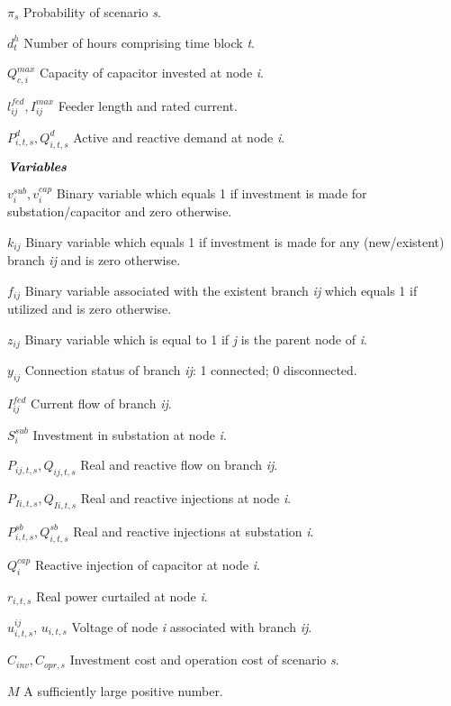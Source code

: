 \documentclass[journal]{IEEEtran}
\theoremstyle{remark}
\begin{document}
\begin{IEEEdescription}
\item[$\pi_{s}$] Probability of scenario \textit{s}.
\item[$d_{t}^{h}$] Number of hours comprising time block \textit{t}.
\item[$Q_{c,i}^{max} $] Capacity of capacitor invested at node \textit{i}.
\item[$  l_{ij}^{fed},I_{ij}^{max}$] Feeder length and rated current.
\item[$ P_{i,t,s}^{d},Q_{i,t,s}^{d}$] Active and reactive demand at node \textit{i}.\\
\item[$\textbf{\textit{Variables}}$]
\item[$v_{i}^{sub},v_{i}^{cap} $] Binary variable which equals 1 if investment is made for substation/capacitor and zero otherwise.
\item[$ k_{ij}$] Binary variable which equals 1 if investment is made for any (new/existent) branch \textit{ij} and is zero otherwise.
\item[$ f_{ij}$] Binary variable associated with the existent branch \textit{ij} which equals 1 if utilized and is zero otherwise.
\item[$z_{ij} $]Binary variable which is equal to 1 if \textit{j} is the parent node of \textit{i}.
\item[$y_{ij} $] Connection status of branch \textit{ij}: 1 connected; 0 disconnected.
\item[$I_{ij}^{fed} $] Current flow of branch \textit{ij}.
\item[$ S_{i}^{sub} $] Investment in substation at node \textit{i}.
\item[$P_{ij,t,s},Q_{ij,t,s} $]Real and reactive flow on branch \textit{ij}.
\item[$ P_{Ii,t,s},Q_{Ii,t,s} $] Real and reactive injections at node \textit{i}.
\item[$ P_{i,t,s}^{sb}, Q_{i,t,s}^{sb}$] Real and reactive injections at substation \textit{i}.
\item[$Q_{i}^{cap} $] Reactive injection of capacitor at node \textit{i}.
\item[$r_{i,t,s} $] Real power curtailed at node \textit{i}.
\item[$u_{i,t,s}^{ij}$, $u_{i,t,s}$] Voltage of node \textit{i} associated with branch \textit{ij}.
\item[$C_{inv}, C_{opr,s} $] Investment cost and operation cost of scenario \textit{s}.
\item[$M$] A sufficiently large positive number.
\end{IEEEdescription}
\end{document}
